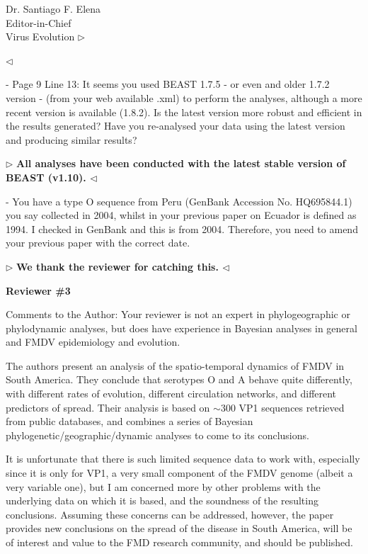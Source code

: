 \documentclass[ucla,biomath,12pt,noaddrfooter,datefrom]{UC_letter}
\newenvironment{reply}{$\triangleright$\bf}{$\triangleleft$}
\begin{document}
\begin{letter}{
Dr. Santiago F. Elena \\
Editor-in-Chief \\
Virus Evolution
}
\begin{reply}

\end{reply}

-       Page 9 Line 13: It seems you used BEAST 1.7.5 - or even and older 1.7.2 version - (from your web available .xml) to perform the analyses, although a more recent version is available (1.8.2). 
Is the latest version more robust and efficient in the results generated? 
Have you re-analysed your data using the latest version and producing similar results?

\begin{reply}
All analyses have been conducted with the latest stable version of BEAST (v1.10). 
\end{reply}

-       You have a type O sequence from Peru (GenBank Accession No. HQ695844.1) you say collected in 2004, whilst in your previous paper on Ecuador is defined as 1994. 
I checked in GenBank and this is from 2004. 
Therefore, you need to amend your previous paper with the correct date.

\begin{reply}
We thank the reviewer for catching this.
\end{reply}

\textbf{Reviewer \#3}

Comments to the Author: Your reviewer is not an expert in phylogeographic or phylodynamic analyses, but does have experience in Bayesian analyses in general and FMDV epidemiology and evolution.

The authors present an analysis of the spatio-temporal dynamics of FMDV in South America. 
They conclude that serotypes O and A behave quite differently, with different rates of evolution, different circulation networks, and different predictors of spread. 
Their analysis is based on $\sim$300 VP1 sequences retrieved from public databases, and combines a series of Bayesian phylogenetic/geographic/dynamic analyses to come to its conclusions.

It is unfortunate that there is such limited sequence data to work with, especially since it is only for VP1, a very small component of the FMDV genome (albeit a very variable one), but I am concerned more by other problems with the underlying data on which it is based, and the soundness of the resulting conclusions. 
Assuming these concerns can be addressed, however, the paper provides new conclusions on the spread of the disease in South America, will be of interest and value to the FMD research community, and should be published.


\end{letter}
\end{document}
